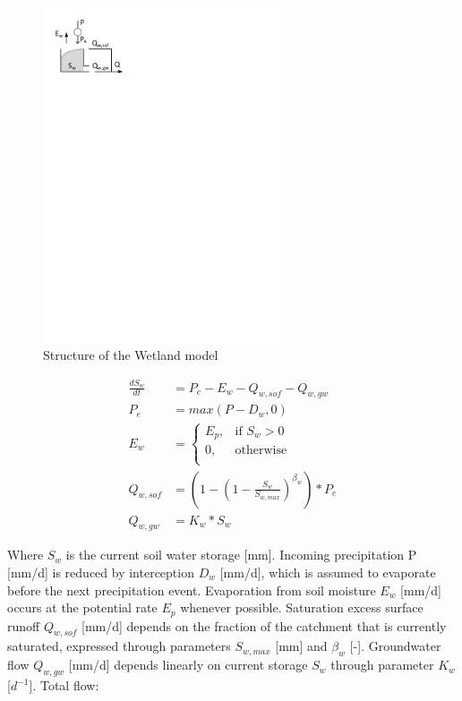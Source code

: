 { 																	%
\begin{figure}
\includegraphics[trim=1cm 24cm 9cm 1cm,width=7cm,keepaspectratio]{./AppA_files/02_schematic.pdf}
\caption{Structure of the Wetland model} \label{fig:02_schematic}
\end{figure}

\begin{align}
	\frac{dS_w}{dt} &= P_e-E_w-Q_{w,sof}-Q_{w,gw} \\
	P_e &= max(P-D_w,0)\\
	E_w &= 
	\begin{cases}
		E_p, & \text{if } S_w > 0 \\
		0, & \text{otherwise}\\
	\end{cases}\\
	Q_{w,sof} &= \left(1-\left(1-\frac{S_w}{S_{w,max}}\right)^{\beta_w}\right)*P_e\\
	Q_{w,gw} &= K_w * S_w
\end{align}

} %

Where $S_w$ is the current soil water storage [mm]. Incoming precipitation P [mm/d] is reduced by interception $D_w$ [mm/d], which is assumed to evaporate before the next precipitation event. Evaporation from soil moisture $E_w$ [mm/d] occurs at the potential rate $E_p$ whenever possible. Saturation excess surface runoff $Q_{w,sof}$ [mm/d] depends on the fraction of the catchment that is currently saturated, expressed through parameters $S_{w,max}$ [mm] and $\beta_w$ [-]. Groundwater flow $Q_{w,gw}$ [mm/d] depends linearly on current storage $S_w$ through parameter $K_w$ [$d^{-1}$]. Total flow:

